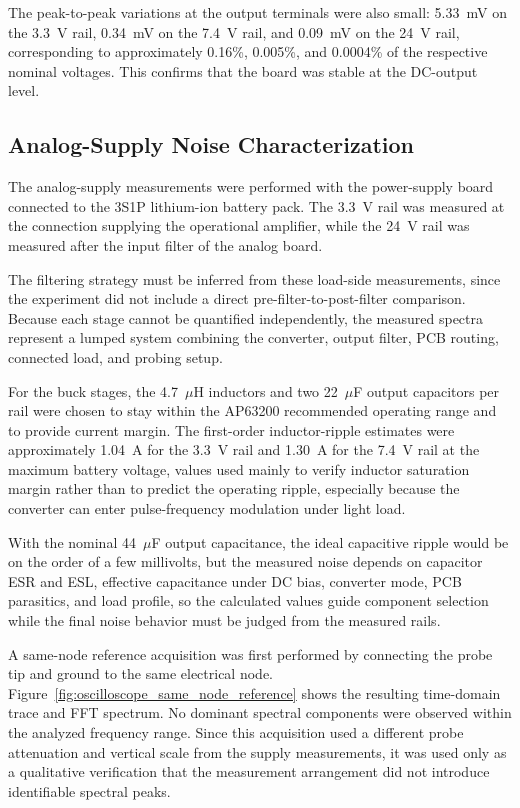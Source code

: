 The peak-to-peak variations at the output terminals were also small: 5.33~mV on the 3.3~V rail, 0.34~mV on the 7.4~V rail, and 0.09~mV on the 24~V rail, corresponding to approximately 0.16\%, 0.005\%, and 0.0004\% of the respective nominal voltages. This confirms that the board was stable at the DC-output level.

\subsection{Analog-Supply Noise Characterization}

The analog-supply measurements were performed with the power-supply board connected to the 3S1P lithium-ion battery pack. The 3.3~V rail was measured at the connection supplying the operational amplifier, while the 24~V rail was measured after the input filter of the analog board.

The filtering strategy must be inferred from these load-side measurements, since the experiment did not include a direct pre-filter-to-post-filter comparison. Because each stage cannot be quantified independently, the measured spectra represent a lumped system combining the converter, output filter, PCB routing, connected load, and probing setup.

For the buck stages, the 4.7~$\mu$H inductors and two 22~$\mu$F output capacitors per rail were chosen to stay within the AP63200 recommended operating range and to provide current margin. The first-order inductor-ripple estimates were approximately 1.04~A for the 3.3~V rail and 1.30~A for the 7.4~V rail at the maximum battery voltage, values used mainly to verify inductor saturation margin rather than to predict the operating ripple, especially because the converter can enter pulse-frequency modulation under light load. 

With the nominal 44~$\mu$F output capacitance, the ideal capacitive ripple would be on the order of a few millivolts, but the measured noise depends on capacitor ESR and ESL, effective capacitance under DC bias, converter mode, PCB parasitics, and load profile, so the calculated values guide component selection while the final noise behavior must be judged from the measured rails.

A same-node reference acquisition was first performed by connecting the probe tip and ground to the same electrical node. Figure~\ref{fig:oscilloscope_same_node_reference} shows the resulting time-domain trace and FFT spectrum. No dominant spectral components were observed within the analyzed frequency range. Since this acquisition used a different probe attenuation and vertical scale from the supply measurements, it was used only as a qualitative verification that the measurement arrangement did not introduce identifiable spectral peaks.

